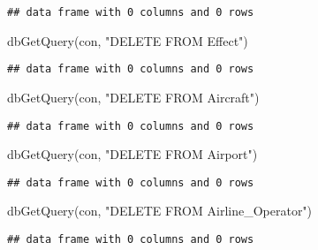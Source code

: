\documentclass[
]{article}
\newenvironment{Shaded}{\begin{snugshade}}{\end{snugshade}}
\newcommand{\CommentTok}[1]{\textcolor[rgb]{0.56,0.35,0.01}{\textit{#1}}}
\newcommand{\ControlFlowTok}[1]{\textcolor[rgb]{0.13,0.29,0.53}{\textbf{#1}}}
\newcommand{\DecValTok}[1]{\textcolor[rgb]{0.00,0.00,0.81}{#1}}
\newcommand{\FunctionTok}[1]{\textcolor[rgb]{0.00,0.00,0.00}{#1}}
\newcommand{\NormalTok}[1]{#1}
\newcommand{\OtherTok}[1]{\textcolor[rgb]{0.56,0.35,0.01}{#1}}
\newcommand{\SpecialCharTok}[1]{\textcolor[rgb]{0.00,0.00,0.00}{#1}}
\newcommand{\StringTok}[1]{\textcolor[rgb]{0.31,0.60,0.02}{#1}}
\begin{document}
\begin{verbatim}
## data frame with 0 columns and 0 rows
\end{verbatim}

\begin{Shaded}
\begin{Highlighting}[]
\FunctionTok{dbGetQuery}\NormalTok{(con, }\StringTok{"DELETE FROM Effect"}\NormalTok{)}
\end{Highlighting}
\end{Shaded}

\begin{verbatim}
## data frame with 0 columns and 0 rows
\end{verbatim}

\begin{Shaded}
\begin{Highlighting}[]
\FunctionTok{dbGetQuery}\NormalTok{(con, }\StringTok{"DELETE FROM Aircraft"}\NormalTok{)}
\end{Highlighting}
\end{Shaded}

\begin{verbatim}
## data frame with 0 columns and 0 rows
\end{verbatim}

\begin{Shaded}
\begin{Highlighting}[]
\FunctionTok{dbGetQuery}\NormalTok{(con, }\StringTok{"DELETE FROM Airport"}\NormalTok{)}
\end{Highlighting}
\end{Shaded}

\begin{verbatim}
## data frame with 0 columns and 0 rows
\end{verbatim}

\begin{Shaded}
\begin{Highlighting}[]
\FunctionTok{dbGetQuery}\NormalTok{(con, }\StringTok{"DELETE FROM Airline\_Operator"}\NormalTok{)}
\end{Highlighting}
\end{Shaded}

\begin{verbatim}
## data frame with 0 columns and 0 rows
\end{verbatim}

\begin{Shaded}
\end{Shaded}
\end{document}

